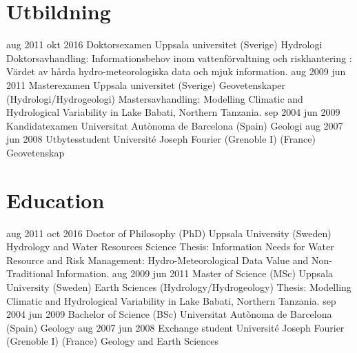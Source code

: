 \ifswedish
    \section{Utbildning}
        \position
            {aug 2011 \textemdash{} okt 2016}
            {Doktorsexamen}
            {Uppsala universitet (Sverige)}
            {Hydrologi \newline
            Doktorsavhandling: Informationsbehov inom vattenförvaltning och riskhantering : Värdet av hårda hydro-meteorologiska data och mjuk information.}
        \position
            {aug 2009 \textemdash{} jun 2011}
            {Masterexamen}
            {Uppsala universitet (Sverige)}
            {Geovetenskaper (Hydrologi/Hydrogeologi) \newline
            Mastersavhandling: Modelling Climatic and Hydrological Variability in Lake Babati, Northern Tanzania.}
        \position
            {sep 2004 \textemdash{} jun 2009}
            {Kandidatexamen}
            {Universitat Autònoma de Barcelona (Spain)}
            {Geologi}
        \position
            {aug 2007 \textemdash{} jun 2008}
            {Utbytesstudent}
            {Université Joseph Fourier (Grenoble I) (France)}
            {Geovetenskap}
\else
    \section{Education}
        \position
            {aug 2011 \textemdash{} oct 2016}
            {Doctor of Philosophy (PhD)}
            {Uppsala University (Sweden)}
            {Hydrology and Water Resources Science \newline
            Thesis: Information Needs for Water Resource and Risk Management: Hydro-Meteorological Data Value and Non-Traditional Information.}
        \position
            {aug 2009 \textemdash{} jun 2011}
            {Master of Science (MSc)}
            {Uppsala University (Sweden)}
            {Earth Sciences (Hydrology/Hydrogeology) \newline
            Thesis: Modelling Climatic and Hydrological Variability in Lake Babati, Northern Tanzania.}
        \position
            {sep 2004 \textemdash{} jun 2009}
            {Bachelor of Science (BSc)}
            {Universitat Autònoma de Barcelona (Spain)}
            {Geology}
        \position
            {aug 2007 \textemdash{} jun 2008}
            {Exchange student}
            {Université Joseph Fourier (Grenoble I) (France)}
            {Geology and Earth Sciences}
\fi